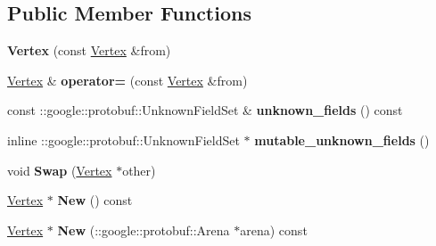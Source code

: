 \subsection*{Public Member Functions}
\begin{DoxyCompactItemize}
\item 
\hypertarget{classstruct_definitions_1_1_vertex_a29946d7bfb2b365d4a06121d218247b7}{}\label{classstruct_definitions_1_1_vertex_a29946d7bfb2b365d4a06121d218247b7} 
{\bfseries Vertex} (const \hyperlink{classstruct_definitions_1_1_vertex}{Vertex} \&from)
\item 
\hypertarget{classstruct_definitions_1_1_vertex_a35adb3e60d3777a34cddad3a1bc6924d}{}\label{classstruct_definitions_1_1_vertex_a35adb3e60d3777a34cddad3a1bc6924d} 
\hyperlink{classstruct_definitions_1_1_vertex}{Vertex} \& {\bfseries operator=} (const \hyperlink{classstruct_definitions_1_1_vertex}{Vertex} \&from)
\item 
\hypertarget{classstruct_definitions_1_1_vertex_a49de6dc3263a7cafae534138f71fd091}{}\label{classstruct_definitions_1_1_vertex_a49de6dc3263a7cafae534138f71fd091} 
const \+::google\+::protobuf\+::\+Unknown\+Field\+Set \& {\bfseries unknown\+\_\+fields} () const
\item 
\hypertarget{classstruct_definitions_1_1_vertex_a7bf60052c80c265a92a6c04ab34646f8}{}\label{classstruct_definitions_1_1_vertex_a7bf60052c80c265a92a6c04ab34646f8} 
inline \+::google\+::protobuf\+::\+Unknown\+Field\+Set $\ast$ {\bfseries mutable\+\_\+unknown\+\_\+fields} ()
\item 
\hypertarget{classstruct_definitions_1_1_vertex_a79f9d4828037cb6b59f0137af10c0bc4}{}\label{classstruct_definitions_1_1_vertex_a79f9d4828037cb6b59f0137af10c0bc4} 
void {\bfseries Swap} (\hyperlink{classstruct_definitions_1_1_vertex}{Vertex} $\ast$other)
\item 
\hypertarget{classstruct_definitions_1_1_vertex_ad9c98eea3c77edadd76a5964a209c875}{}\label{classstruct_definitions_1_1_vertex_ad9c98eea3c77edadd76a5964a209c875} 
\hyperlink{classstruct_definitions_1_1_vertex}{Vertex} $\ast$ {\bfseries New} () const
\item 
\hypertarget{classstruct_definitions_1_1_vertex_ab285437a080415170657599ca98dff51}{}\label{classstruct_definitions_1_1_vertex_ab285437a080415170657599ca98dff51} 
\hyperlink{classstruct_definitions_1_1_vertex}{Vertex} $\ast$ {\bfseries New} (\+::google\+::protobuf\+::\+Arena $\ast$arena) const
\item 
\hypertarget{classstruct_definitions_1_1_vertex_ac668766d8d3310d0bdbe50f75ac328e5}{}\label{classstruct_definitions_1_1_vertex_ac668766d8d3310d0bdbe50f75ac328e5} 

\end{DoxyCompactItemize}
